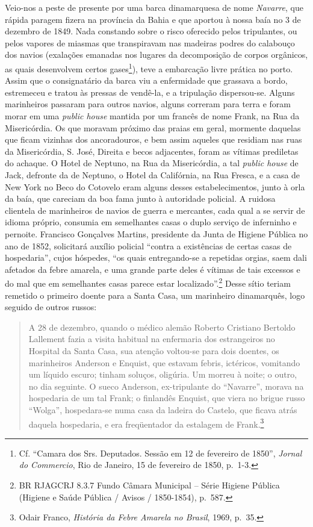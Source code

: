 Veio-nos a peste de presente por uma barca dinamarquesa de nome
\emph{Navarre}, que rápida paragem fizera na província da Bahia e que
aportou à nossa baía no 3 de dezembro de 1849. Nada constando sobre o
risco oferecido pelos tripulantes, ou pelos vapores de miasmas que
transpiravam nas madeiras podres do calabouço dos navios (exalações
emanadas nos lugares da decomposição de corpos orgânicos, as quais
desenvolvem certos gases\footnote{Cf. ``Camara dos Srs. Deputados.
  Sessão em 12 de fevereiro de 1850'', \emph{Jornal do Commercio}, Rio
  de Janeiro, 15 de fevereiro de 1850, p.~1-3.}), teve a embarcação
livre prática no porto. Assim que o consignatário da barca viu a
enfermidade que grassava a bordo, estremeceu e tratou às pressas de
vendê-la, e a tripulação dispersou-se. Alguns marinheiros passaram para
outros navios, alguns correram para terra e foram morar em uma
\emph{public house} mantida por um francês de nome Frank, na Rua da
Misericórdia. Os que moravam próximo das praias em geral, mormente
daquelas que ficam vizinhas dos ancoradouros, e bem assim aqueles que
residiam nas ruas da Misericórdia, S. José, Direita e becos adjacentes,
foram as vítimas prediletas do achaque. O Hotel de Neptuno, na Rua da
Misericórdia, a tal \emph{public house} de Jack, defronte da de Neptuno,
o Hotel da Califórnia, na Rua Fresca, e a casa de New York no Beco do
Cotovelo eram alguns desses estabelecimentos, junto à orla da baía, que
careciam da boa fama junto à autoridade policial. A ruidosa clientela de
marinheiros de navios de guerra e mercantes, cada qual a se servir de
idioma próprio, consumia em semelhantes casas o duplo serviço de
inferninho e pernoite. Francisco Gonçalves Martins, presidente da Junta
de Higiene Pública no ano de 1852, solicitará auxílio policial ``contra
a existências de certas casas de hospedaria'', cujos hóspedes, ``os
quais entregando-se a repetidas orgias, saem dali afetados da febre
amarela, e uma grande parte deles é vítimas de tais excessos e do mal
que em semelhantes casas parece estar localizado''.\footnote{BR RJAGCRJ
  8.3.7 Fundo Câmara Municipal -- Série Higiene Pública (Higiene e Saúde
  Pública / Avisos / 1850-1854), p.~587.} Desse sítio teriam remetido o
primeiro doente para a Santa Casa, um marinheiro dinamarquês, logo
seguido de outros russos:

\begin{quote}
A 28 de dezembro, quando o médico alemão Roberto Cristiano Bertoldo
Lallement fazia a visita habitual na enfermaria dos estrangeiros no
Hospital da Santa Casa, sua atenção voltou-se para dois doentes, os
marinheiros Anderson e Enquist, que estavam febris, ictéricos, vomitando
um líquido escuro; tinham soluços, oligúria. Um morreu à noite; o outro,
no dia seguinte. O sueco Anderson, ex-tripulante do ``Navarre'', morava
na hospedaria de um tal Frank; o finlandês Enquist, que viera no brigue
russo ``Wolga'', hospedara-se numa casa da ladeira do Castelo, que
ficava atrás daquela hospedaria, e era freqüentador da estalagem de
Frank.\footnote{Odair Franco, \emph{História da Febre Amarela no
  Brasil}, 1969, p.~35.}
\end{quote}

